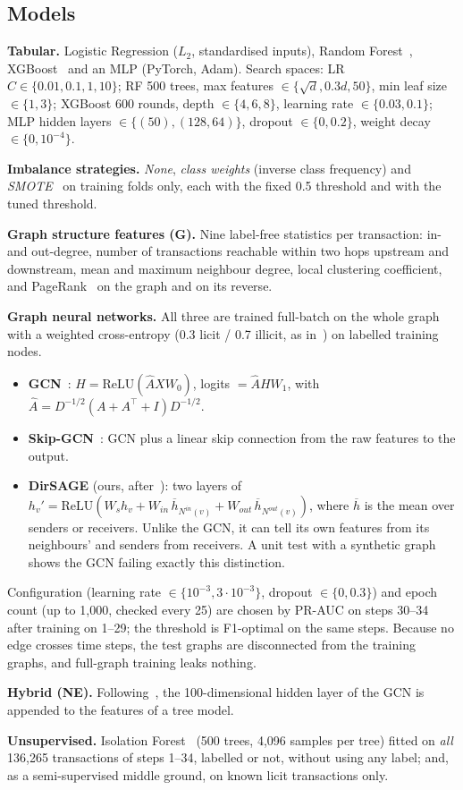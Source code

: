 \subsection{Models}

\textbf{Tabular.} Logistic Regression ($L_2$, standardised inputs), Random
Forest~\cite{breiman2001}, XGBoost~\cite{chen2016} and an MLP (PyTorch, Adam).
Search spaces: LR $C\in\{0.01,0.1,1,10\}$; RF 500 trees, max features
$\in\{\sqrt{d}, 0.3d, 50\}$, min leaf size $\in\{1,3\}$; XGBoost 600 rounds,
depth $\in\{4,6,8\}$, learning rate $\in\{0.03, 0.1\}$; MLP hidden layers
$\in\{(50),(128,64)\}$, dropout $\in\{0,0.2\}$, weight decay $\in\{0,10^{-4}\}$.

\textbf{Imbalance strategies.} \emph{None}, \emph{class weights} (inverse class
frequency) and \emph{SMOTE}~\cite{chawla2002} on training folds only, each with
the fixed 0.5 threshold and with the tuned threshold.

\textbf{Graph structure features (G).} Nine label-free statistics per
transaction: in- and out-degree, number of transactions reachable within two hops
upstream and downstream, mean and maximum neighbour degree, local clustering
coefficient, and PageRank~\cite{page1999} on the graph and on its reverse.

\textbf{Graph neural networks.} All three are trained full-batch on the whole
graph with a weighted cross-entropy (0.3 licit / 0.7 illicit, as
in~\cite{weber2019}) on labelled training nodes.
\begin{itemize}
  \item \textbf{GCN}~\cite{kipf2017}: $H=\mathrm{ReLU}(\hat{A}XW_0)$,
        logits $=\hat{A}HW_1$, with $\hat{A}=D^{-1/2}(A+A^\top+I)D^{-1/2}$.
  \item \textbf{Skip-GCN}~\cite{weber2019}: GCN plus a linear skip connection
        from the raw features to the output.
  \item \textbf{DirSAGE} (ours, after~\cite{hamilton2017,rossi2023}): two
        layers of $h_v' = \mathrm{ReLU}(W_s h_v + W_{in}\,\overline{h}_{N^{in}(v)}
        + W_{out}\,\overline{h}_{N^{out}(v)})$, where $\overline{h}$ is the mean
        over senders or receivers. Unlike the GCN, it can tell its own features
        from its neighbours' and senders from receivers. A unit test with a
        synthetic graph shows the GCN failing exactly this distinction.
\end{itemize}
Configuration (learning rate $\in\{10^{-3}, 3\cdot10^{-3}\}$, dropout
$\in\{0,0.3\}$) and epoch count (up to 1,000, checked every 25) are chosen by
PR-AUC on steps 30--34 after training on 1--29; the threshold is F1-optimal on
the same steps. Because no edge crosses time steps, the test graphs are
disconnected from the training graphs, and full-graph training leaks nothing.

\textbf{Hybrid (NE).} Following~\cite{weber2019}, the 100-dimensional hidden
layer of the GCN is appended to the features of a tree model.

\textbf{Unsupervised.} Isolation Forest~\cite{liu2008} (500 trees, 4,096 samples
per tree) fitted on \emph{all} 136,265 transactions of steps 1--34, labelled or
not, without using any label; and, as a semi-supervised middle ground, on known
licit transactions only.
